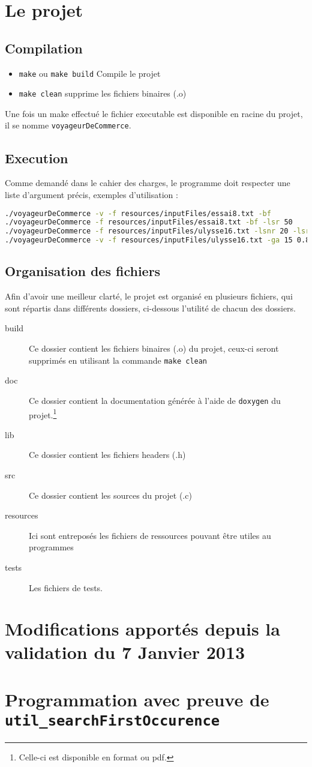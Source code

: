 \documentclass[a4paper, 11pt]{article}
\begin{document}
	\maketitle
	\section{Le projet}
	\subsection{Compilation}
	\begin{itemize}
		\item \texttt{make} ou \texttt{make build} Compile le projet
		\item \texttt{make clean} supprime les fichiers binaires (.o)
	\end{itemize}
	Une fois un make effectué le fichier executable est disponible en racine du projet, il se nomme \texttt{voyageurDeCommerce}. 	
	\subsection{Execution}
	Comme demandé dans le cahier des charges, le programme doit respecter une liste d'argument précis, exemples d'utilisation :
	\begin{lstlisting}[language=sh, basicstyle=\scriptsize\ttfamily, caption=Exemple d'execution du programme]
./voyageurDeCommerce -v -f resources/inputFiles/essai8.txt -bf
./voyageurDeCommerce -f resources/inputFiles/essai8.txt -bf -lsr 50
./voyageurDeCommerce -f resources/inputFiles/ulysse16.txt -lsnr 20 -lsr 50
./voyageurDeCommerce -v -f resources/inputFiles/ulysse16.txt -ga 15 0.8
	\end{lstlisting}
	\subsection{Organisation des fichiers}
	Afin d'avoir une meilleur clarté, le projet est organisé en plusieurs fichiers, qui sont répartis dans différents dossiers, ci-dessous l'utilité de chacun
	des dossiers.

	\begin{description}
		\item[{build}] Ce dossier contient les fichiers binaires (.o) du projet, ceux-ci seront supprimés en utilisant la commande
			\texttt{make clean} 
		\item[{doc}] Ce dossier contient la documentation générée à l'aide de \texttt{doxygen} du projet.\footnote{Celle-ci est disponible en format  ou
			pdf.}
		\item[{lib}] Ce dossier contient les fichiers headers (.h)
		\item[{src}] Ce dossier contient les sources du projet (.c) 
		\item[{resources}] Ici sont entreposés les fichiers de ressources pouvant être utiles au programmes 
		\item[{tests}] Les fichiers de tests. 
	\end{description}
	\section{Modifications apportés depuis la validation du 7 Janvier 2013}
	\section{Programmation avec preuve de \texttt{util\_searchFirstOccurence}}
\end{document}
